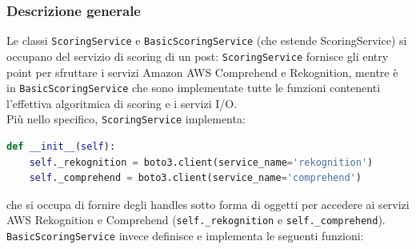 \subsubsection{Descrizione generale}
Le classi \verb+ScoringService+ e \verb+BasicScoringService+ (che estende ScoringService\verb++) si occupano
del servizio di scoring di un post: \verb+ScoringService+ fornisce gli entry point per sfruttare 
i servizi Amazon AWS Comprehend e Rekognition, mentre è in \verb+BasicScoringService+ che sono 
implementate tutte le funzioni contenenti l'effettiva algoritmica di scoring e i servizi I/O.\\
Più nello specifico, \verb+ScoringService+ implementa:
\begin{lstlisting}[language=Python]
def __init__(self):
    self._rekognition = boto3.client(service_name='rekognition')
    self._comprehend = boto3.client(service_name='comprehend')
\end{lstlisting}
che si occupa di fornire degli handles sotto forma di oggetti per accedere ai servizi AWS Rekognition
e Comprehend (\verb+self._rekognition+ e \verb+self._comprehend+).\\
\verb+BasicScoringService+ invece definisce e implementa le seguenti funzioni:

